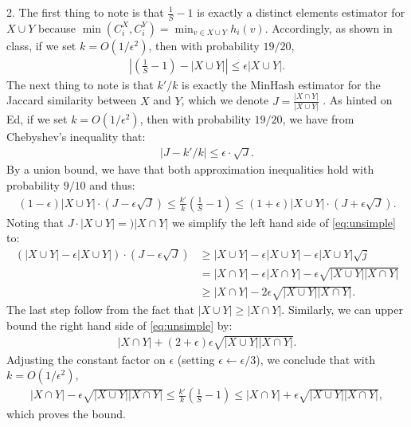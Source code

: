\documentclass[11pt]{article}
\begin{document}
\vspace{.5em}
2. The first thing to note is that $\frac{1}{S} - 1$ is exactly a distinct elements estimator for $X\cup Y$ because $\min(C_i^X, C_i^Y) = \min_{v \in X \cup Y} h_i(v)$. Accordingly, as shown in class, if we set $k = O(1/\epsilon^2)$, then with probability $19/20$, 
\begin{align*}
	\left|\left(\frac{1}{S} - 1\right) - |X\cup Y|\right| \leq \epsilon  |X\cup Y|. 
\end{align*}
The next thing to note is that $k'/k$ is exactly the MinHash estimator for the Jaccard similarity between $X$ and $Y$, which we denote $J = \frac{|X\cap Y|}{|X\cup Y|}$ . As hinted on Ed, if we set $k = O(1/\epsilon^2)$, then with probability $19/20$, we have from Chebyshev's inequality that:
\begin{align*}
	\left|J - k'/k \right|\leq \epsilon \cdot \sqrt{J}. 
\end{align*}
By a union bound, we have that both approximation inequalities hold with probability $9/10$ and thus:
\begin{align}
	\label{eq:unsimple}
	(1-\epsilon)|X\cup Y|\cdot (J - \epsilon \sqrt{J}) \leq \frac{k'}{k}\left(\frac{1}{S} - 1\right)\leq (1+\epsilon)|X\cup Y|\cdot (J + \epsilon \sqrt{J}).
\end{align}
Noting that $J \cdot|X\cup Y| = )|X\cap Y|$ we simplify the left hand side of \eqref{eq:unsimple} to:
\begin{align*}
	(|X\cup Y|-\epsilon|X\cup Y|)\cdot (J - \epsilon \sqrt{J}) &\geq |X\cup Y| -\epsilon |X\cup Y|  - \epsilon |X\cup Y|\sqrt{j} \\
	& = |X\cap Y| -\epsilon |X\cap Y|  - \epsilon \sqrt{|X\cup Y||X\cap Y|} \\
	&\geq |X\cap Y|  - 2 \epsilon \sqrt{|X\cup Y||X\cap Y|}.
\end{align*}
The last step follow from the fact that $|X\cup Y| \geq  |X\cap Y|$. 
Similarly, we can upper bound the right hand side of \eqref{eq:unsimple} by:
\begin{align*}
	|X\cap Y|  + (2+\epsilon) \epsilon \sqrt{|X\cup Y||X\cap Y|}. 
\end{align*}
Adjusting the constant factor on $\epsilon$ (setting $\epsilon \gets \epsilon/3$), we conclude that with $k = O(1/\epsilon^2)$, 
\begin{align*}
		|X\cap Y|  - \epsilon \sqrt{|X\cup Y||X\cap Y|}\leq \frac{k'}{k}\left(\frac{1}{S} - 1\right)\leq 	|X\cap Y|  + \epsilon \sqrt{|X\cup Y||X\cap Y|}, 
\end{align*}
which proves the bound. 
\end{document}
